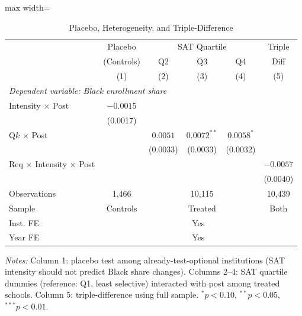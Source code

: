 \begin{table}[htbp]
\centering
\caption{Placebo, Heterogeneity, and Triple-Difference}
\label{tab:robustness}
\begin{adjustbox}{max width=\textwidth}
\begin{tabular}{lccccc}
\hline\hline
 & Placebo & \multicolumn{3}{c}{SAT Quartile} & Triple \\
 & (Controls) & Q2 & Q3 & Q4 & Diff \\
 & (1) & (2) & (3) & (4) & (5) \\
\hline
\multicolumn{6}{l}{\textit{Dependent variable: Black enrollment share}} \\
Intensity $\times$ Post & $-0.0015$ & & & & \\
 & (0.0017) & & & & \\
Q$k$ $\times$ Post & & $0.0051$ & $0.0072^{**}$ & $0.0058^{*}$ & \\
 & & (0.0033) & (0.0033) & (0.0032) & \\
Req $\times$ Intensity $\times$ Post & & & & & $-0.0057$ \\
 & & & & & (0.0040) \\
\hline
Observations & 1,466 & \multicolumn{3}{c}{10,115} & 10,439 \\
Sample & Controls & \multicolumn{3}{c}{Treated} & Both \\
Inst. FE & \multicolumn{5}{c}{Yes} \\
Year FE & \multicolumn{5}{c}{Yes} \\
\hline\hline
\end{tabular}
\end{adjustbox}
\begin{tablenotes}[flushleft]
\small
\item \textit{Notes:} Column 1: placebo test among already-test-optional institutions (SAT intensity should not predict Black share changes). Columns 2--4: SAT quartile dummies (reference: Q1, least selective) interacted with post among treated schools. Column 5: triple-difference using full sample. $^{*} p<0.10$, $^{**} p<0.05$, $^{***} p<0.01$.
\end{tablenotes}
\end{table}
